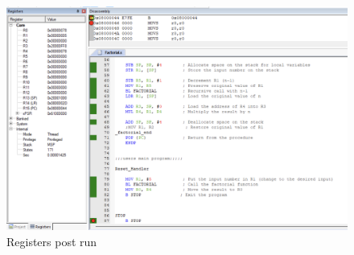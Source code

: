 \documentclass{article}
\begin{document}
\begin{figure}
\caption{Registers post run}
\centering
\includegraphics[width=\textwidth]{../Images/factorial_register.png}
\end{figure}
\end{document}
